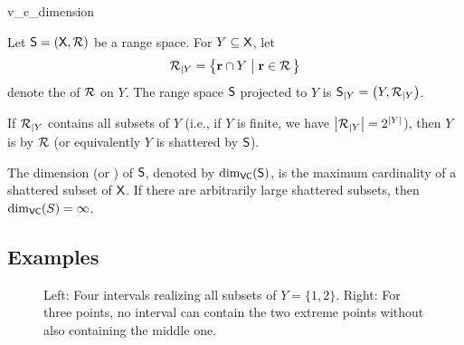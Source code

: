 \begin{fragment}{v_c_dimension}
    \begin{defn}
        Let $\mathsf{S} = (\textsf{X},{\mathcal{R}})$ be a range
        space. For $Y \subseteq \textsf{X}$, let
        \begin{equation}
            \VCProj{\RangeSet}{Y}%
            =%
            \Set{\range \cap Y}{ \range \in \RangeSet\bigr.\,}
            \eqlab{v:c:project}
        \end{equation}
        denote the  of
        ${\mathcal{R}}$ on $Y$. The range space $\mathsf{S}$ projected to
        $Y$ is $\VCProj{\RangeSpace}{Y} = \pth{Y,
           \VCProj{\RangeSet}{Y}}$.
        
        If ${\mathcal{R}}_{|Y}$ contains all subsets of $Y$ (i.e.,
        if $Y$ is finite, we have $\left| {{\mathcal{R}}_{|Y}} \right| =
        2^{\left| {Y} \right|}$), then $Y$ is  by ${\mathcal{R}}$
        (or equivalently $Y$ is shattered by $\mathsf{S}$).
        
        The  dimension (or
        ) of
        $\mathsf{S}$, denoted by $\mathrm{dim}_{\mathsf{VC}}(\mathsf{S})$, is the
        maximum cardinality of a shattered subset of $\textsf{X}$. If
        there are arbitrarily large shattered subsets, then
        $\mathrm{dim}_{\mathsf{VC}}(S) = \infty$.
    \end{defn}
\end{fragment}


\subsection{Examples}




\begin{figure}[t]
    \phantom{}
    \hfill%
    \hfill%
    \hfill{}
    \phantom{}

    \caption{Left: Four intervals realizing all subsets of
       $Y = \{1,2\}$. Right: For three points, no interval
       can contain the two extreme points without also
       containing the middle one.}
\end{figure}

